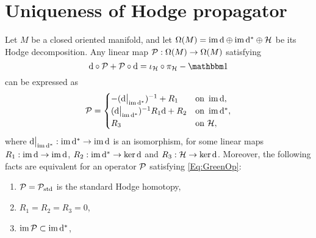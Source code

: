 \documentclass[\MainFolder/Text.tex]{subfiles}
\begin{document}
\section{Uniqueness of Hodge propagator}\label{Sec:TZ}

\begin{Proposition}\label{Prop:UniHO}
Let $M$ be a closed oriented manifold, and let $\Omega(M)=\operatorname{im}\mathrm{d}\oplus\operatorname{im}\mathrm{d}^*\oplus\mathcal{H}$ be its Hodge decomposition. Any linear map $\mathcal{P}:\Omega(M)\rightarrow\Omega(M)$ satisfying
\begin{equation}\label{Eq:GreenOp}
\Dd\circ\Htp + \Htp\circ\Dd = \iota_\Harm\circ\pi_\Harm - \Id 
\end{equation}
can be expressed as
\begin{equation} \label{Eq:GreenOpForm}
\Htp = \begin{cases}
 -(\Restr{\Dd}{\Im\CoDd})^{-1} + R_1 & \text{on }\Im \Dd, \\
 (\Restr{\Dd}{\Im\CoDd})^{-1} R_1 \Dd + R_2 & \text{on } \Im \CoDd, \\
 R_3 & \text{on }\Harm,
\end{cases}
\end{equation}
where $\Restr{\Dd}{\Im \CoDd} : \Im \CoDd \rightarrow \Im \Dd$ is an isomorphism, for some linear maps $R_1: \operatorname{im} \mathrm{d} \rightarrow \operatorname{im} \mathrm{d}$, $R_2: \operatorname{im} \mathrm{d}^* \rightarrow \operatorname{ker} \mathrm{d}$ and $R_3: \mathcal{H} \rightarrow \operatorname{ker} \mathrm{d}$. Moreover, the following facts are equivalent for an operator $\mathcal{P}$ satisfying \eqref{Eq:GreenOp}:
\begin{enumerate}[label=(\arabic*)]
\item $\mathcal{P} = \mathcal{P}_{\mathrm{std}}$ is the standard Hodge homotopy,
\item $R_1 = R_2 = R_3 = 0$,
\item $\operatorname{im}\mathcal{P}\subset\operatorname{im}\mathrm{d}^*$, 
\end{enumerate}
\end{Proposition}
\end{document}
